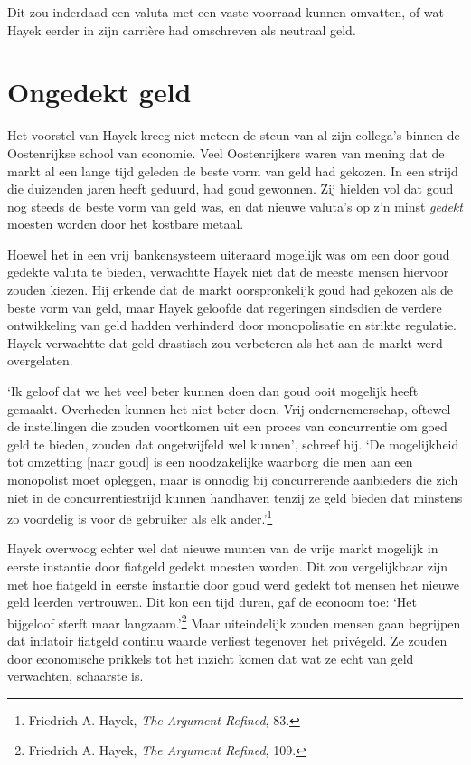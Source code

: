 \documentclass[
  a5paper,
  smalldemyvopaper,11pt,twoside,onecolumn,openright,extrafontsizes,
hidelinks]{memoir}
\begin{document}
Dit zou inderdaad een valuta met een vaste voorraad kunnen omvatten, of
wat Hayek eerder in zijn carrière had omschreven als neutraal geld.

\section{Ongedekt geld}\label{ongedekt-geld}

Het voorstel van Hayek kreeg niet meteen de steun van al zijn collega's
binnen de Oostenrijkse school van economie. Veel Oostenrijkers waren van
mening dat de markt al een lange tijd geleden de beste vorm van geld had
gekozen. In een strijd die duizenden jaren heeft geduurd, had goud
gewonnen. Zij hielden vol dat goud nog steeds de beste vorm van geld
was, en dat nieuwe valuta's op z'n minst \emph{gedekt} moesten worden
door het kostbare metaal.

Hoewel het in een vrij bankensysteem uiteraard mogelijk was om een door
goud gedekte valuta te bieden, verwachtte Hayek niet dat de meeste
mensen hiervoor zouden kiezen. Hij erkende dat de markt oorspronkelijk
goud had gekozen als de beste vorm van geld, maar Hayek geloofde dat
regeringen sindsdien de verdere ontwikkeling van geld hadden verhinderd
door monopolisatie en strikte regulatie. Hayek verwachtte dat geld
drastisch zou verbeteren als het aan de markt werd overgelaten.

`Ik geloof dat we het veel beter kunnen doen dan goud ooit mogelijk
heeft gemaakt. Overheden kunnen het niet beter doen. Vrij
ondernemerschap, oftewel de instellingen die zouden voortkomen uit een
proces van concurrentie om goed geld te bieden, zouden dat ongetwijfeld
wel kunnen', schreef hij. `De mogelijkheid tot omzetting {[}naar goud{]}
is een noodzakelijke waarborg die men aan een monopolist moet opleggen,
maar is onnodig bij concurrerende aanbieders die zich niet in de
concurrentiestrijd kunnen handhaven tenzij ze geld bieden dat minstens
zo voordelig is voor de gebruiker als elk ander.'\footnote{Friedrich A.
  Hayek, \emph{The Argument Refined}, 83.}

Hayek overwoog echter wel dat nieuwe munten van de vrije markt mogelijk
in eerste instantie door fiatgeld gedekt moesten worden. Dit zou
vergelijkbaar zijn met hoe fiatgeld in eerste instantie door goud werd
gedekt tot mensen het nieuwe geld leerden vertrouwen. Dit kon een tijd
duren, gaf de econoom toe: `Het bijgeloof sterft maar
langzaam.'\footnote{Friedrich A. Hayek, \emph{The Argument Refined},
  109.} Maar uiteindelijk zouden mensen gaan begrijpen dat inflatoir
fiatgeld continu waarde verliest tegenover het privégeld. Ze zouden door
economische prikkels tot het inzicht komen dat wat ze echt van geld
verwachten, schaarste is.
\end{document}
